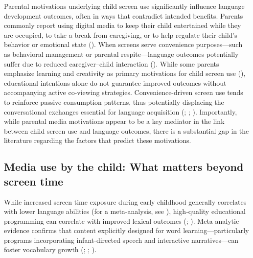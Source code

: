 \documentclass[
  man,
  floatsintext,
  longtable,
  nolmodern,
  notxfonts,
  notimes,
  colorlinks=true,linkcolor=blue,citecolor=blue,urlcolor=blue]{apa7}
\begin{document}
Parental motivations underlying child screen use significantly influence
language development outcomes, often in ways that contradict intended
benefits. Parents commonly report using digital media to keep their
child entertained while they are occupied, to take a break from
caregiving, or to help regulate their child's behavior or emotional
state ().
When screens serve convenience purposes---such as behavioral management
or parental respite---language outcomes potentially suffer due to
reduced caregiver--child interaction
().
While some parents emphasize learning and creativity as primary
motivations for child screen use
(),
educational intentions alone do not guarantee improved outcomes without
accompanying active co-viewing strategies. Convenience-driven screen use
tends to reinforce passive consumption patterns, thus potentially
displacing the conversational exchanges essential for language
acquisition (; ;
). Importantly, while parental media motivations appear to be a key
mediator in the link between child screen use and language outcomes,
there is a substantial gap in the literature regarding the factors that
predict these motivations.

\subsection{Media use by the child: What matters beyond screen
time}\label{media-use-by-the-child-what-matters-beyond-screen-time}

While increased screen time exposure during early childhood generally
correlates with lower language abilities (for a meta-analysis, see
),
high-quality educational programming can correlate with improved lexical
outcomes (;
). Meta-analytic evidence confirms that content explicitly
designed for word learning---particularly programs incorporating
infant-directed speech and interactive narratives---can foster
vocabulary growth (; ;
).
\end{document}
